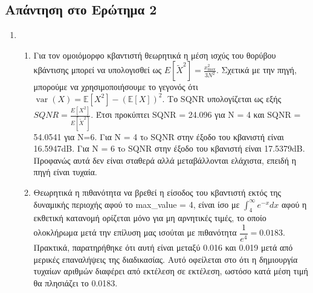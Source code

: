 \documentclass{article}
\begin{document}
\subsection*{Απάντηση στο Ερώτημα 2}
    \begin{enumerate}
        Το SQNR μετριέται παντού σε dB.
        \item
        \begin{enumerate}[label=(\roman*)]
            \item Για τον ομοιόμορφο κβαντιστή θεωρητικά η μέση ισχύς του θορύβου κβάντισης μπορεί να υπολογισθεί ως $E\left[\tilde{X}^{2}\right]=\frac{x_{\max }^{2}}{3 N^{2}}$. Σχετικά με την πηγή, μπορούμε να χρησιμοποιήσουμε το γεγονός ότι $\operatorname{var}(X)=\mathbb{E}\left[X^{2}\right]-(\mathbb{E}[X])^{2}$. Το SQNR υπολογίζεται ως εξής $SQNR=\frac{E\left[X^{2}\right]}{E\left[\tilde{X}^{2}\right]}$.
            Έτσι προκύπτει SQNR = 24.096 για Ν = 4 και SQNR = 54.0541 για N=6.
            Για Ν = 4 τo SQNR στην έξοδο του κβανιστή είναι 16.5947dB. Για Ν = 6 τo SQNR στην έξοδο του κβανιστή είναι 17.5379dB. Προφανώς αυτά δεν είναι σταθερά αλλά μεταβάλλονται ελάχιστα, επειδή η πηγή είναι τυχαία.%
            
            \item Θεωρητικά η πιθανότητα να βρεθεί η είσοδος του κβαντιστή εκτός της δυναμικής περιοχής αφού το max\_value = 4, είναι ίσο με $\int ^{\infty }_{4}e^{-x}dx$ αφού η εκθετική κατανομή ορίζεται μόνο για μη αρνητικές τιμές, το οποίο ολοκλήρωμα μετά την επίλυση μας ισούται με πιθανότητα $\dfrac{1}{e^{4}} = 0.0183$. Πρακτικά, παρατηρήθηκε ότι αυτή είναι μεταξύ 0.016 και 0.019 μετά από μερικές επαναλήψεις της διαδικασίας. Αυτό οφείλεται στο ότι η δημιουργία τυχαίων αριθμών διαφέρει από εκτέλεση σε εκτέλεση, ωστόσο κατά μέση τιμή θα πλησιάζει το 0.0183.
        \end{enumerate}
        

\end{enumerate}
\end{document}
